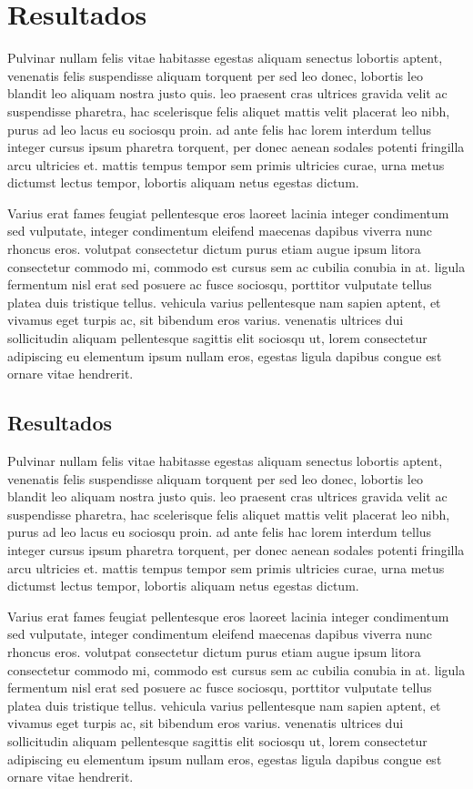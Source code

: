 \section{Resultados}

Pulvinar nullam felis vitae habitasse egestas aliquam senectus lobortis aptent, venenatis felis suspendisse aliquam torquent per sed leo donec, lobortis leo blandit leo aliquam nostra justo quis. leo praesent cras ultrices gravida velit ac suspendisse pharetra, hac scelerisque felis aliquet mattis velit placerat leo nibh, purus ad leo lacus eu sociosqu proin. ad ante felis hac lorem interdum tellus integer cursus ipsum pharetra torquent, per donec aenean sodales potenti fringilla arcu ultricies et. mattis tempus tempor sem primis ultricies curae, urna metus dictumst lectus tempor, lobortis aliquam netus egestas dictum.

Varius erat fames feugiat pellentesque eros laoreet lacinia integer condimentum sed vulputate, integer condimentum eleifend maecenas dapibus viverra nunc rhoncus eros. volutpat consectetur dictum purus etiam augue ipsum litora consectetur commodo mi, commodo est cursus sem ac cubilia conubia in at. ligula fermentum nisl erat sed posuere ac fusce sociosqu, porttitor vulputate tellus platea duis tristique tellus. vehicula varius pellentesque nam sapien aptent, et vivamus eget turpis ac, sit bibendum eros varius. venenatis ultrices dui sollicitudin aliquam pellentesque sagittis elit sociosqu ut, lorem consectetur adipiscing eu elementum ipsum nullam eros, egestas ligula dapibus congue est ornare vitae hendrerit.


\subsection{Resultados}

Pulvinar nullam felis vitae habitasse egestas aliquam senectus lobortis aptent, venenatis felis suspendisse aliquam torquent per sed leo donec, lobortis leo blandit leo aliquam nostra justo quis. leo praesent cras ultrices gravida velit ac suspendisse pharetra, hac scelerisque felis aliquet mattis velit placerat leo nibh, purus ad leo lacus eu sociosqu proin. ad ante felis hac lorem interdum tellus integer cursus ipsum pharetra torquent, per donec aenean sodales potenti fringilla arcu ultricies et. mattis tempus tempor sem primis ultricies curae, urna metus dictumst lectus tempor, lobortis aliquam netus egestas dictum.

Varius erat fames feugiat pellentesque eros laoreet lacinia integer condimentum sed vulputate, integer condimentum eleifend maecenas dapibus viverra nunc rhoncus eros. volutpat consectetur dictum purus etiam augue ipsum litora consectetur commodo mi, commodo est cursus sem ac cubilia conubia in at. ligula fermentum nisl erat sed posuere ac fusce sociosqu, porttitor vulputate tellus platea duis tristique tellus. vehicula varius pellentesque nam sapien aptent, et vivamus eget turpis ac, sit bibendum eros varius. venenatis ultrices dui sollicitudin aliquam pellentesque sagittis elit sociosqu ut, lorem consectetur adipiscing eu elementum ipsum nullam eros, egestas ligula dapibus congue est ornare vitae hendrerit.


